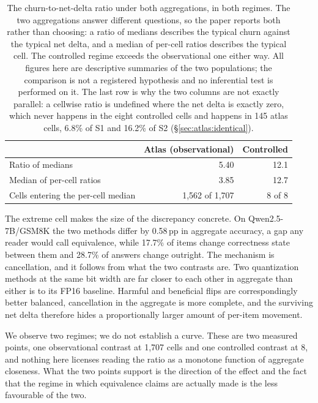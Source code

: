 \begin{table}[!t]
\centering
\caption{The churn-to-net-delta ratio under both aggregations, in both regimes.
The two aggregations answer different questions, so the paper reports both
rather than choosing: a ratio of medians describes the typical churn against the
typical net delta, and a median of per-cell ratios describes the typical cell.
The controlled regime exceeds the observational one either way. All figures here
are descriptive summaries of the two populations; the comparison is not a
registered hypothesis and no inferential test is performed on it. The last row is
why the two columns are not exactly parallel: a cellwise ratio is undefined
where the net delta is exactly zero, which never happens in the eight controlled
cells and happens in 145 atlas cells, 6.8\% of S1 and 16.2\% of S2
(\S\ref{sec:atlas:identical}).}
\label{tab:churn-aggregations}
\begin{tabular}{lrr}
\toprule
 & Atlas (observational) & Controlled \\
\midrule
Ratio of medians                    & 5.40            & 12.1 \\
Median of per-cell ratios           & 3.85            & 12.7 \\
Cells entering the per-cell median  & 1{,}562 of 1{,}707 & 8 of 8 \\
\bottomrule
\end{tabular}
\end{table}

The extreme cell makes the size of the discrepancy concrete. On
Qwen2.5-7B/GSM8K the two methods differ by 0.58\,pp in aggregate
accuracy, a gap any reader would call equivalence, while 17.7\% of
items change correctness state between them and 28.7\% of answers
change outright. The mechanism is cancellation, and it follows from what the two
contrasts are. Two quantization methods at the same bit width are far closer to
each other in aggregate than either is to its FP16 baseline. Harmful and
beneficial flips are correspondingly better balanced, cancellation in the
aggregate is more complete, and the surviving net delta therefore hides a
proportionally larger amount of per-item movement.

We observe two regimes; we do not establish a curve. These are two
measured points, one observational contrast at 1{,}707 cells and one controlled
contrast at 8, and nothing here licenses reading the ratio as a monotone
function of aggregate closeness. What the two points support is the direction of
the effect and the fact that the regime in which equivalence claims are actually
made is the less favourable of the two.

